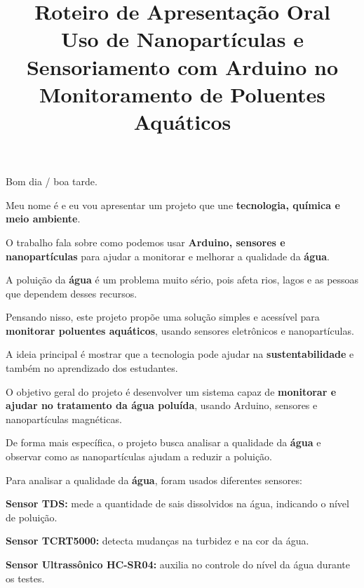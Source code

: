\documentclass[12pt]{article}
\title{
\textcolor{roxo}{Roteiro de Apresenta\c{c}\~ao Oral}\\
\textbf{\textcolor{azul}{Uso de Nanopart\'iculas e Sensoriamento com Arduino no Monitoramento de Poluentes Aqu\'aticos}}
}
\author{}
\date{}
\begin{document}
\maketitle
\onehalfspacing

\begin{tcolorbox}[colback=blue!5,colframe=azul,title=\textbf{Abertura}]
Bom dia / boa tarde.

Meu nome \'{e} \underline{\hspace{6cm}} e eu vou apresentar um projeto que une \textbf{tecnologia, qu\'imica e meio ambiente}.

O trabalho fala sobre como podemos usar \textbf{Arduino, sensores e nanopart\'iculas} para ajudar a monitorar e melhorar a qualidade da \textbf{\'agua}.
\end{tcolorbox}

\begin{tcolorbox}[colback=green!5,colframe=verde,title=\textbf{Introdu\c{c}\~ao}]
A polui\c{c}\~ao da \textbf{\'agua} \'{e} um problema muito s\'erio, pois afeta rios, lagos e as pessoas que dependem desses recursos.

Pensando nisso, este projeto prop\~oe uma solu\c{c}\~ao simples e acess\'ivel para \textbf{monitorar poluentes aqu\'aticos}, usando sensores eletr\^onicos e nanopart\'iculas.

A ideia principal \'{e} mostrar que a tecnologia pode ajudar na \textbf{sustentabilidade} e tamb\'em no aprendizado dos estudantes.
\end{tcolorbox}

\begin{tcolorbox}[colback=orange!5,colframe=laranja,title=\textbf{Objetivo do Projeto}]
O objetivo geral do projeto \'{e} desenvolver um sistema capaz de \textbf{monitorar e ajudar no tratamento da \'agua polu\'ida}, usando Arduino, sensores e nanopart\'iculas magn\'eticas.

De forma mais espec\'ifica, o projeto busca analisar a qualidade da \textbf{\'agua} e observar como as nanopart\'iculas ajudam a reduzir a polui\c{c}\~ao.
\end{tcolorbox}

\begin{tcolorbox}[colback=purple!5,colframe=roxo,title=\textbf{Sensores Utilizados}]
Para analisar a qualidade da \textbf{\'agua}, foram usados diferentes sensores:

\textbf{Sensor TDS:} mede a quantidade de sais dissolvidos na \'agua, indicando o n\'ivel de polui\c{c}\~ao.

\textbf{Sensor \optico TCRT5000:} detecta mudan\c{c}as na turbidez e na cor da \'agua.

\textbf{Sensor Ultrass\^onico HC-SR04:} auxilia no controle do n\'ivel da \'agua durante os testes.
\end{tcolorbox}
\end{document}
